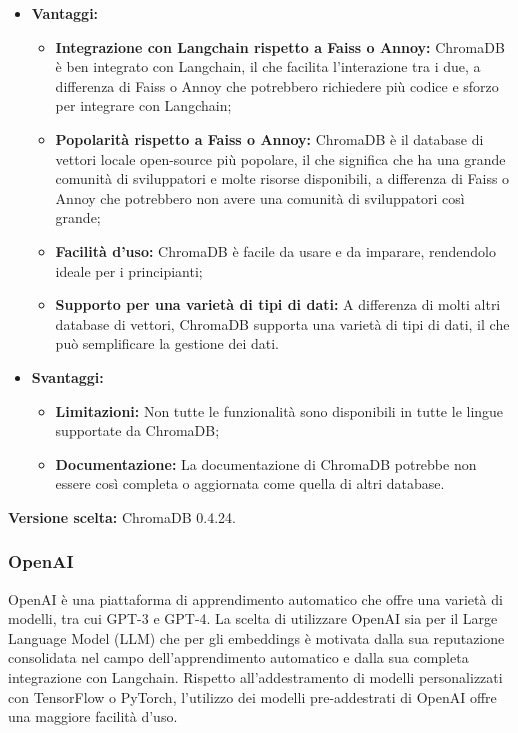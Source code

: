 \documentclass[10pt, a4paper]{article}
\begin{document}
\begin{itemize}
\item \textbf{Vantaggi:}
\begin{itemize}
\item \textbf{Integrazione con Langchain rispetto a Faiss o Annoy:} ChromaDB è ben integrato con Langchain, il che facilita l'interazione tra i due, a differenza di Faiss o Annoy che potrebbero richiedere più codice e sforzo per integrare con Langchain;
\item \textbf{Popolarità rispetto a Faiss o Annoy:} ChromaDB è il database di vettori locale open-source più popolare, il che significa che ha una grande comunità di sviluppatori e molte risorse disponibili, a differenza di Faiss o Annoy che potrebbero non avere una comunità di sviluppatori così grande;
\item \textbf{Facilità d'uso:} ChromaDB è facile da usare e da imparare, rendendolo ideale per i principianti;
\item \textbf{Supporto per una varietà di tipi di dati:} A differenza di molti altri database di vettori, ChromaDB supporta una varietà di tipi di dati, il che può semplificare la gestione dei dati.
\end{itemize}
\item \textbf{Svantaggi:}
\begin{itemize}
\item \textbf{Limitazioni:} Non tutte le funzionalità sono disponibili in tutte le lingue supportate da ChromaDB;
\item \textbf{Documentazione:} La documentazione di ChromaDB potrebbe non essere così completa o aggiornata come quella di altri database.
\end{itemize}
\end{itemize}
\textbf{Versione scelta:} ChromaDB 0.4.24.

\subsubsection{OpenAI}
OpenAI è una piattaforma di apprendimento automatico che offre una varietà di modelli, tra cui GPT-3 e GPT-4. La scelta di utilizzare OpenAI sia per il Large Language Model (LLM) che per gli embeddings è motivata dalla sua reputazione consolidata nel campo dell'apprendimento automatico e dalla sua completa integrazione con Langchain. Rispetto all’addestramento di modelli personalizzati con TensorFlow o PyTorch, l’utilizzo dei modelli pre-addestrati di OpenAI offre una maggiore facilità d’uso.
\end{document}
